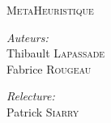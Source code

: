 \documentclass{report}
\begin{document}
\dominitoc








\begin{titlepage}
\begin{center}
\textsc{\LARGE MetaHeuristique}\\[1.5cm]
\end{center}

\begin{minipage}{0.4\textwidth}
	\begin{flushleft} \large
		\emph{Auteurs:}\\
			Thibault \textsc{Lapassade} \\
			Fabrice \textsc{Rougeau} \\
	\end{flushleft}
\end{minipage}
\begin{minipage}{0.4\textwidth}
	\begin{flushright} \large
		\emph{Relecture:} \\
              Patrick \textsc{Siarry}
	\end{flushright}
\end{minipage}
\end{titlepage}
\end{document}

